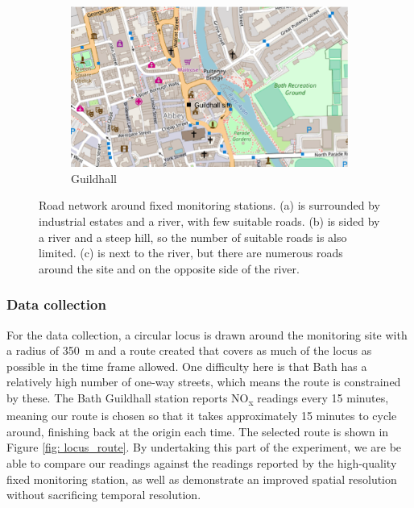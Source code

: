 \documentclass[11pt,twosided,a4paper]{report}
\begin{document}
\begin{figure}[!tb]
\begin{minipage}{.9\linewidth}
\begin{subfigure}[t]{.5\linewidth}
            \includegraphics[width=\textwidth]{images/guildhall}
            \caption{Guildhall}
            \label{fig: guildhall}
        \end{subfigure}
    \end{minipage}
    \caption[Analysis of fixed monitoring station locations.]{Road network around fixed monitoring stations. (a) is surrounded by industrial estates and a river, with few suitable roads. (b) is sided by a river and a steep hill, so the number of suitable roads is also limited. (c) is next to the river, but there are numerous roads around the site and on the opposite side of the river.}
\end{figure}


\subsubsection{Data collection}

For the data collection, a circular locus is drawn around the monitoring site with a radius of 350~m and a route created that covers as much of the locus as possible in the time frame allowed. One difficulty here is that Bath has a relatively high number of one-way streets, which means the route is constrained by these. The Bath Guildhall station reports NO\textsubscript{x} readings every 15 minutes, meaning our route is chosen so that it takes approximately 15 minutes to cycle around, finishing back at the origin each time. The selected route is shown in Figure \ref{fig: locus_route}. By undertaking this part of the experiment, we are be able to compare our readings against the readings reported by the high-quality fixed monitoring station, as well as demonstrate an improved spatial resolution without sacrificing temporal resolution.
\end{document}
